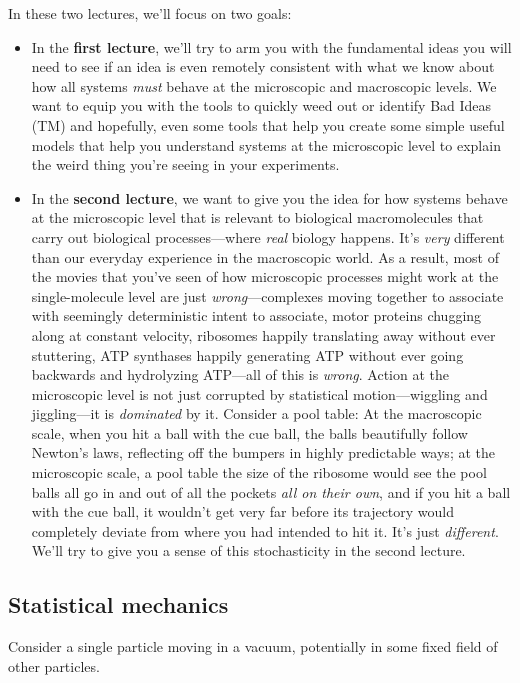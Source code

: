 \documentclass[english,course]{lecture}
\begin{document}
In these two lectures, we'll focus on two goals:
\begin{itemize}
\item In the {\bf first lecture}, we'll try to arm you with the fundamental ideas you will need to see if an idea is even remotely consistent with what we know about how all systems \emph{must} behave at the microscopic and macroscopic levels. We want to equip you with the tools to quickly weed out or identify Bad Ideas (TM) and hopefully, even some tools that help you create some simple useful models that help you understand systems at the microscopic level to explain the weird thing you're seeing in your experiments.
\item In the {\bf second lecture}, we want to give you the idea for how systems behave at the microscopic level that is relevant to biological macromolecules that carry out biological processes---where \emph{real} biology happens. It's \emph{very} different than our everyday experience in the macroscopic world. As a result, most of the movies that you've seen of how microscopic processes might work at the single-molecule level are just \emph{wrong}---complexes moving together to associate with seemingly deterministic intent to associate, motor proteins chugging along at constant velocity, ribosomes happily translating away without ever stuttering, ATP synthases happily generating ATP without ever going backwards and hydrolyzing ATP---all of this is \emph{wrong}. Action at the microscopic level is not just corrupted by statistical motion---wiggling and jiggling---it is \emph{dominated} by it. Consider a pool table: At the macroscopic scale, when you hit a ball with the cue ball, the balls beautifully follow Newton's laws, reflecting off the bumpers in highly predictable ways; at the microscopic scale, a pool table the size of the ribosome would see the pool balls all go in and out of all the pockets \emph{all on their own}, and if you hit a ball with the cue ball, it wouldn't get very far before its trajectory would completely deviate from where you had intended to hit it. It's just \emph{different}. We'll try to give you a sense of this stochasticity in the second lecture.
\end{itemize}

\vfill
\eject

\subsection{Statistical mechanics}

Consider a single particle moving in a vacuum, potentially in some fixed field of other particles.
\end{document}
